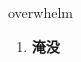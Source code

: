 
\begin{frame}
{\huge overwhelm}
\begin{center}
\begin{enumerate}\Large
  \item \textbf{淹没}
\end{enumerate}
\end{center}
\end{frame}
